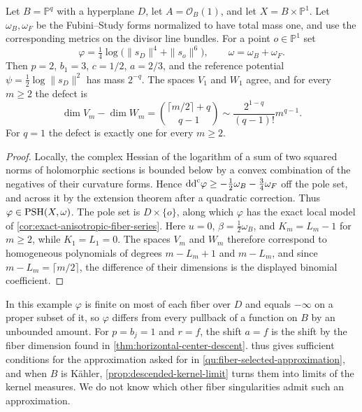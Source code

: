 \begin{example}\label{ex:anisotropic-fiber-sharp-error}
Let $B=\mathbb P^q$ with a hyperplane $D$, let $A=\mathcal O_B(1)$, and let $X=B\times\mathbb P^1$. Let $\omega_B,\omega_F$ be the Fubini--Study forms normalized to have total mass one, and use the corresponding metrics on the divisor line bundles. For a point $o\in\mathbb P^1$ set
\[
 \varphi=\tfrac14\log\bigl(\|s_D\|^4+\|s_o\|^6\bigr),\qquad
 \omega=\omega_B+\omega_F.
\]
Then $p=2$, $b_1=3$, $c=1/2$, $a=2/3$, and the reference potential $\psi=\tfrac12\log\|s_D\|^2$ has mass $2^{-q}$. The spaces $V_1$ and $W_1$ agree, and for every $m\geq2$ the defect is
\[
 \dim V_m-\dim W_m
    =\binom{\lceil m/2\rceil+q}{q-1}
    \sim\frac{2^{1-q}}{(q-1)!}m^{q-1}.
\]
For $q=1$ the defect is exactly one for every $m\geq2$.
\end{example}
\begin{proof}
Locally, the complex Hessian of the logarithm of a sum of two squared norms of holomorphic sections is bounded below by a convex combination of the negatives of their curvature forms. Hence $\mathrm{dd}^{\mathrm{c}}\varphi\geq-\tfrac12\omega_B-\tfrac34\omega_F$ off the pole set, and across it by the extension theorem after a quadratic correction. Thus $\varphi\in\mathrm{PSH}(X,\omega)$. The pole set is $D\times\{o\}$, along which $\varphi$ has the exact local model of \cref{cor:exact-anisotropic-fiber-series}. Here $u=0$, $\beta=\tfrac12\omega_B$, and $K_m=L_m-1$ for $m\geq2$, while $K_1=L_1=0$. The spaces $V_m$ and $W_m$ therefore correspond to homogeneous polynomials of degrees $m-L_m+1$ and $m-L_m$, and since $m-L_m=\lceil m/2\rceil$, the difference of their dimensions is the displayed binomial coefficient.
\end{proof}

In this example $\varphi$ is finite on most of each fiber over $D$ and equals $-\infty$ on a proper subset of it, so $\varphi$ differs from every pullback of a function on $B$ by an unbounded amount. For $p=b_j=1$ and $r=f$, the shift $a=f$ is the shift by the fiber dimension found in \cref{thm:horizontal-center-descent}.  thus gives sufficient conditions for the approximation asked for in \cref{qu:fiber-selected-approximation}, and when $B$ is K\"ahler, \cref{prop:descended-kernel-limit} turns them into limits of the kernel measures. We do not know which other fiber singularities admit such an approximation.


